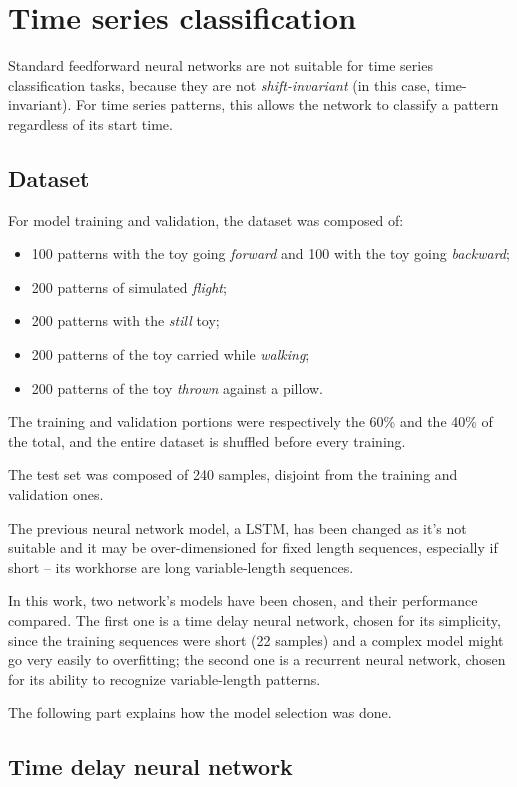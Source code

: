 \section{Time series classification}
Standard feedforward neural networks are not suitable for time series classification tasks, because they are not \textit{shift-invariant} (in this case, time-invariant). For time series patterns, this allows the network to classify a pattern regardless of its start time.
\bigbreak

\subsection{Dataset}
For model training and validation, the dataset was composed of:
\begin{itemize}
	\item 100 patterns with the toy going \textit{forward} and 100 with the toy going \textit{backward};
	\item 200 patterns of simulated \textit{flight};
	\item 200 patterns with the \textit{still} toy;
	\item 200 patterns of the toy carried while \textit{walking};
	\item 200 patterns of the toy \textit{thrown} against a pillow.
\end{itemize}
The training and validation portions were respectively the 60\% and the 40\% of the total, and the entire dataset is shuffled before every training.

The test set was composed of 240 samples, disjoint from the training and validation ones.
\bigbreak

The previous neural network model, a LSTM, has been changed as it's not suitable and it may be over-dimensioned for fixed length sequences, especially if short – its workhorse are long variable-length sequences.
\bigbreak

In this work, two network's models have been chosen, and their performance compared. The first one is a time delay neural network, chosen for its simplicity, since the training sequences were short (22 samples) and a complex model might go very easily to overfitting; the second one is a recurrent neural network, chosen for its ability to recognize variable-length patterns.

The following part explains how the model selection was done.
\bigbreak

\subsection{Time delay neural network}
